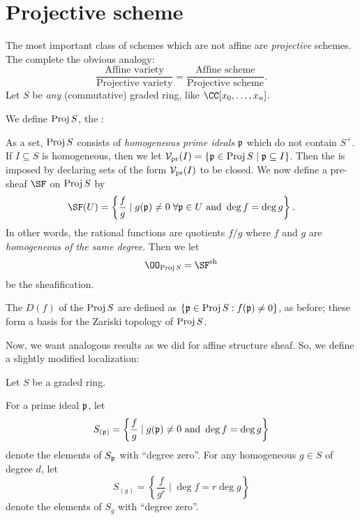 \documentclass[11pt]{scrreprt}
\begin{document}
\section{Projective scheme}
The most important class of schemes which are not affine are
\emph{projective} schemes.
The complete the obvious analogy:
\[
	\frac{\text{Affine variety}}{\text{Projective variety}}
	= 
	\frac{\text{Affine scheme}}{\text{Projective scheme}}.
\]
Let $S$ be \emph{any} (commutative) graded ring, like $\CC[x_0, \dots, x_n]$.
\begin{definition}
	We define $\operatorname{Proj} S$, the :
	\begin{itemize}
		\ii As a set, $\operatorname{Proj} S$ consists of \emph{homogeneous prime ideals}
		$\mathfrak p$ which do not contain $S^+$.
		\ii If $I \subseteq S$ is homogeneous, then
		we let $\mathcal V_{\text{pr}}(I) = \{ \mathfrak p \in \operatorname{Proj} S \mid \mathfrak p \subseteq I \}$.
		Then the  is imposed by declaring 
		sets of the form $\mathcal V_{\text{pr}}(I)$ to be closed.
		\ii We now define a pre-sheaf $\SF$ on $\operatorname{Proj} S$ by
		\[ \SF(U) = 
			\left\{ \frac{f}{g} \mid 
			g(\pp) \neq 0 \; \forall \pp \in U \text{ and }
			\deg f = \deg g \right\}.
		\]
		In other words, the rational functions are quotients $f/g$
		where $f$ and $g$ are \emph{homogeneous of the same degree}.
		Then we let \[ \OO_{\Proj S} = \SF\sh \] be the sheafification.
	\end{itemize}
\end{definition}
\begin{definition}
	The  $D(f)$ of the $\operatorname{Proj} S$
	are defined as $\left\{ \mathfrak p \in \operatorname{Proj} S : f(\mathfrak p) \neq 0 \right\}$,
	as before; these form a basis for the Zariski topology of $\operatorname{Proj} S$.
\end{definition}
Now, we want analogous results as we did for affine structure sheaf.
So, we define a slightly modified localization:
\begin{definition}
	Let $S$ be a graded ring.
	\begin{enumerate}[(i)]
		\ii For a prime ideal $\mathfrak p$, let
		\[ S_{(\mathfrak p)} = \left\{ \frac fg \mid g(\mathfrak p) \neq 0 \text{ and }
			\deg f = \deg g \right\} \]
		denote the elements of $S_\mathfrak p$ with ``degree zero''.
		\ii For any homogeneous $g \in S$ of degree $d$, let
		\[ S_{(g)} = \left\{ \frac{f}{g^r} \mid 
			\deg f = r \deg g \right\} \]
		denote the elements of $S_g$ with ``degree zero''.
	\end{enumerate}
\end{definition}
\end{document}
